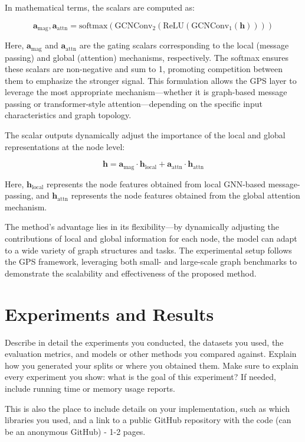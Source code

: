 \documentclass{acmart}
\begin{document}
In mathematical terms, the scalars are computed as:

\begin{equation}
\mathbf{a}_{\text{mag}}, \mathbf{a}_{\text{attn}} = \text{softmax}\left(\text{GCNConv}_2\left(\text{ReLU}\left(\text{GCNConv}_1(\mathbf{h})\right)\right)\right)
\end{equation}


Here, \( \mathbf{a}_{\text{mag}} \) and \( \mathbf{a}_{\text{attn}} \) are the gating scalars corresponding to the local (message passing) and global (attention) mechanisms, respectively. The softmax ensures these scalars are non-negative and sum to 1, promoting competition between them to emphasize the stronger signal. This formulation allows the GPS layer to leverage the most appropriate mechanism—whether it is graph-based message passing or transformer-style attention—depending on the specific input characteristics and graph topology.

The scalar outputs dynamically adjust the importance of the local and global representations at the node level:

\[
\mathbf{h} = \mathbf{a}_{\text{mag}} \cdot \mathbf{h}_{\text{local}} + \mathbf{a}_{\text{attn}} \cdot \mathbf{h}_{\text{attn}}
\]

Here, $\mathbf{h}_{\text{local}}$ represents the node features obtained from local GNN-based message-passing, and $\mathbf{h}_{\text{attn}}$ represents the node features obtained from the global attention mechanism.


The method's advantage lies in its flexibility—by dynamically adjusting the contributions of local and global information for each node, the model can adapt to a wide variety of graph structures and tasks. The experimental setup follows the GPS framework, leveraging both small- and large-scale graph benchmarks to demonstrate the scalability and effectiveness of the proposed method.

\section{Experiments and Results}
Describe in detail the experiments you conducted, the datasets you used, the evaluation metrics, and models or other methods you compared against. Explain how you generated your splits or where you obtained them. Make sure to explain every experiment you show: what is the goal of this experiment? If needed, include running time or memory usage reports.

This is also the place to include details on your implementation, such as which libraries you used, and a link to a public GitHub repository with the code (can be an anonymous GitHub) - 1-2 pages.
\end{document}

